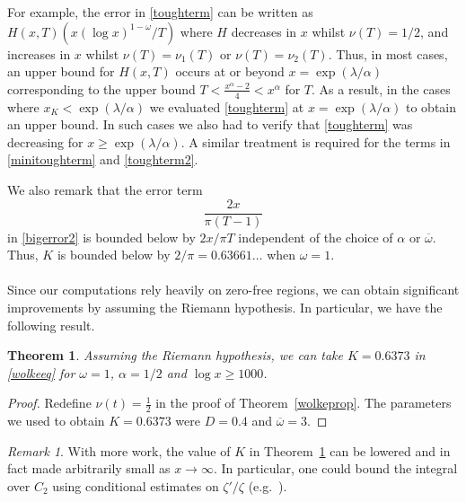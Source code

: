 \documentclass[reqno]{amsart}
\newtheorem{theorem}{Theorem}[section]
\numberwithin{equation}{section}
\theoremstyle{remark}
\newtheorem*{remark}{Remark}
\begin{document}
For example, the error in \eqref{toughterm} can be written as $H(x,T)(x(\log x)^{1-\omega}/T)$ where $H$ decreases in $x$ whilst $\nu(T)=1/2$, and increases in $x$ whilst $\nu(T)=\nu_1(T)$ or $\nu(T)=\nu_2(T)$. Thus, in most cases, an upper bound for $H(x,T)$ occurs at or beyond $x=\exp(\lambda/\alpha)$ corresponding to the upper bound $T<\frac{x^\alpha-2}{4}<x^\alpha$ for $T$. As a result, in the cases where $x_K<\exp(\lambda/\alpha)$ we evaluated \eqref{toughterm} at $x=\exp(\lambda/\alpha)$ to obtain an upper bound. In such cases we also had to verify that \eqref{toughterm} was decreasing for $x\geq\exp(\lambda/\alpha)$. A similar treatment is required for the terms in \eqref{minitoughterm} and \eqref{toughterm2}.

We also remark that the error term 
\begin{equation*}
    \frac{2x}{\pi(T-1)}
\end{equation*}
in \eqref{bigerror2} is bounded below by $2x/\pi T$ independent of the choice of $\alpha$ or $\overline{\omega}$. Thus, $K$ is bounded below by $2/\pi=0.63661\ldots$ when $\omega=1$.\\
\\
Since our computations rely heavily on zero-free regions, we can obtain significant improvements by assuming the Riemann hypothesis. In particular, we have the following result.

\begin{theorem}\label{riemannthm1}
    Assuming the Riemann hypothesis, we can take $K=0.6373$ in \eqref{wolkeeq} for $\omega=1$, $\alpha=1/2$ and $\log x\geq 1000$.
\end{theorem}
\begin{proof}
    Redefine $\nu(t)=\frac{1}{2}$ in the proof of Theorem~\ref{wolkeprop}. The parameters we used to obtain $K=0.6373$ were $D=0.4$ and $\overline{\omega}=3$.
\end{proof}
\begin{remark}
    With more work, the value of $K$ in Theorem~\ref{riemannthm1} can be lowered and in fact made arbitrarily small as $x\to\infty$. In particular, one could bound the integral over $C_2$ using conditional estimates on $\zeta'/\zeta$ (e.g.\ \cite[Corollary 1]{simonic2022estimates}).
\end{remark}
\end{document}
